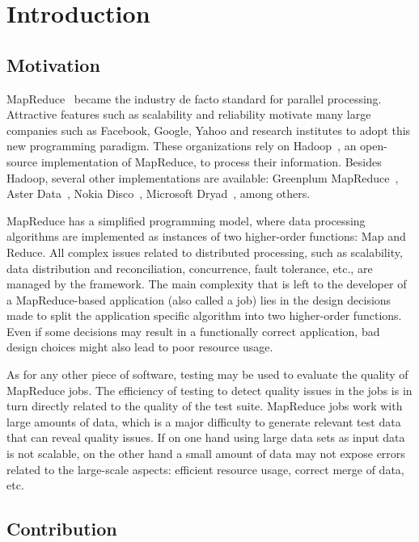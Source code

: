 \chapter{Introduction} %
\label{cha:introduction}

\section{Motivation}

MapReduce~\cite{Dean:2004} became the industry de facto standard for parallel processing. Attractive features such as scalability and reliability motivate many large companies such as Facebook, Google, Yahoo and research institutes to adopt this new programming paradigm. 
These organizations rely on Hadoop~\cite{White:2009}, an open-source implementation of MapReduce, to process their information.
Besides Hadoop, several other implementations are available: Greenplum MapReduce~\cite{Greenplum:2008}, Aster Data~\cite{Aster:2011}, Nokia Disco~\cite{Mundkur:2011},  Microsoft Dryad~\cite{Isard:2007}, among others. 

MapReduce has a simplified programming model, where data processing algorithms are implemented as instances of two higher-order functions: Map and Reduce. All complex issues related to distributed processing, such as scalability, data distribution and reconciliation, concurrence, fault tolerance, etc., are managed by the framework. 
The main complexity that is left to the developer of a MapReduce-based application (also called a job) lies in the design decisions made to split the application specific algorithm into two higher-order functions. Even if some decisions may result in a functionally correct application, bad design choices might also lead to poor resource usage.

As for any other piece of software, testing may be used to evaluate the quality of MapReduce jobs. The efficiency of testing to detect quality issues in the jobs is in turn directly related to the quality of the test suite. MapReduce jobs work with large amounts of data, which is a major difficulty to generate relevant test data that can reveal quality issues. If on one hand using large data sets as input data is not scalable, on the other hand a small amount of data may not expose errors related to the large-scale aspects: efficient resource usage, correct merge of data, etc.

\section{Contribution}

